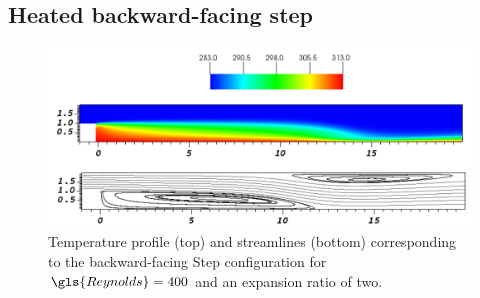 \subsection{Heated backward-facing step}\label{ssec:HeatedBackwardFacingStep}
\begin{figure}[tb]
	\begin{center}
		\includegraphics[width=\linewidth]{../plots/HBFS_TemperatureRe700_2.pdf}
		\caption{Temperature profile (top) and streamlines (bottom) corresponding to the backward-facing Step configuration for $\gls{Reynolds} = 400$ and an expansion ratio of two.}
		\label{BFS_Streamlines}
	\end{center}	
\end{figure} 

